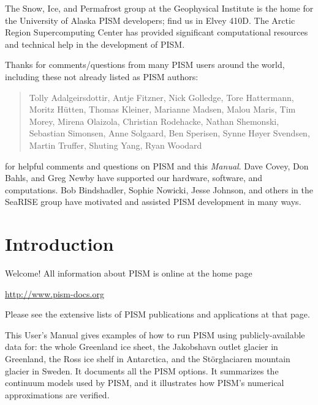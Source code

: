 \documentclass[titlepage,letterpaper,final]{scrartcl}
\begin{document}
The Snow, Ice, and Permafrost group at the Geophysical Institute is the home for the University of Alaska PISM developers; find us in Elvey 410D.  The Arctic Region Supercomputing Center has provided significant computational resources and technical help in the development of PISM.

Thanks for comments/questions from many PISM users around the world, including these not already listed as PISM authors:

\begin{quote}
Tolly Adalgeirsdottir, Antje Fitzner, Nick Golledge, Tore Hattermann, Moritz H\"utten, Thomas Kleiner, Marianne Madsen, Malou Maris, Tim Morey, Mirena Olaizola, Christian Rodehacke, Nathan Shemonski, Sebastian Simonsen, Anne Solgaard, Ben Sperisen, Synne H\o{}yer Svendsen, Martin Truffer, Shuting Yang, Ryan Woodard
\end{quote}

\noindent for helpful comments and questions on PISM and this \emph{Manual}.  Dave Covey, Don Bahls, and Greg Newby have supported our hardware, software, and computations.  Bob Bindshadler, Sophie Nowicki, Jesse Johnson, and others in the SeaRISE group have motivated and assisted PISM development in many ways.  

\normalsize



\newpage
\setcounter{tocdepth}{3}
\small
\tableofcontents
\normalsize

\newpage


\section{Introduction}\label{sec:intro}

Welcome!  All information about PISM is online at the home page
\begin{center}
  \url{http://www.pism-docs.org}
\end{center}
Please see the extensive lists of PISM publications and applications at that page.

This User's Manual gives examples of how to run PISM using publicly-available data for: the whole Greenland ice sheet, the Jakobshavn outlet glacier in Greenland, the Ross ice shelf in Antarctica, and the St\"orglaciaren mountain glacier in Sweden.  It documents all the PISM options.  It summarizes the continuum models used by PISM, and it illustrates how PISM's numerical approximations are verified.
\end{document}
